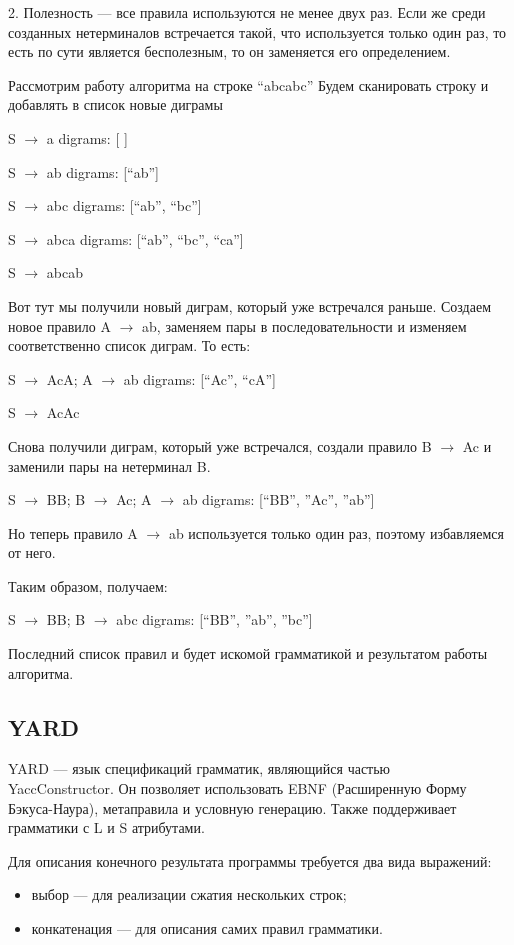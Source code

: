 \documentclass[14pt]{matmex-diploma}
\begin{document}
    2. Полезность --- все правила используются не менее двух раз. Если же среди созданных нетерминалов встречается такой, что используется только один раз, то есть по сути является бесполезным, то он заменяется его определением.

    Рассмотрим работу алгоритма на строке “abcabc”
    Будем сканировать строку и добавлять в список новые диграмы

    S $\rightarrow$ a \tab digrams: [ ]
    
    
    S $\rightarrow$ ab \tab digrams: [“ab”] 
    
    S $\rightarrow$ abc	\tab digrams: [“ab”, “bc”]
    
    
    S $\rightarrow$ abca \tab digrams: [“ab”, “bc”, “ca”]
    
    
    S $\rightarrow$ abcab
    
    Вот тут мы получили новый диграм, который уже встречался раньше. Создаем новое правило A $\rightarrow$ ab, заменяем пары в последовательности и изменяем соответственно список диграм. То есть:
    
    S $\rightarrow$ AcA;  A $\rightarrow$ ab \tab digrams: [“Ac”, “cA”]
    
    
    S $\rightarrow$ AcAc
    
    Снова получили диграм, который уже встречался, создали правило B $\rightarrow$ Ac и заменили пары на нетерминал B. 
    
    S $\rightarrow$ BB;   B $\rightarrow$ Ac;   A $\rightarrow$ ab \tab digrams: [“BB”, ”Ac”, ”ab”]
    
    Но теперь правило A $\rightarrow$ ab используется только один раз, поэтому избавляемся от него.
    
    Таким образом, получаем:
    
    S $\rightarrow$ BB;   B $\rightarrow$ abc \tab digrams: [“BB”, ”ab”, ”bc”]
    
    Последний список правил и будет искомой грамматикой и результатом работы алгоритма.

	\subsection{YARD}
	    YARD --- язык спецификаций грамматик, являющийся частью \\YaccConstructor. Он позволяет использовать EBNF (Расширенную Форму Бэкуса-Наура), метаправила и условную генерацию. Также поддерживает грамматики с L и S атрибутами.
	    
	    Для описания конечного результата программы требуется два вида выражений: \begin{itemize}
	        \item выбор --- для реализации сжатия нескольких строк;
	        \item конкатенация --- для описания самих правил грамматики.
	        \end{itemize}  
	    
\end{document}
